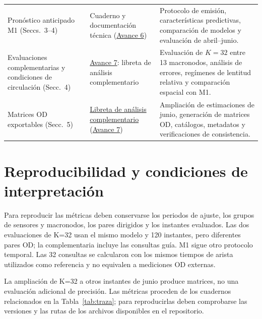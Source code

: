 \documentclass[letterpaper,11pt]{article}
\begin{document}
\begin{table}[H]
\begin{tabular}{@{}
>{\raggedright\arraybackslash}p{.25\linewidth}
>{\raggedright\arraybackslash}p{.27\linewidth}
>{\raggedright\arraybackslash}p{.40\linewidth}
@{}}
Pronóstico anticipado M1 (Seccs.~3--4) &
Cuaderno y documentación técnica
(\href{https://github.com/Luis-MX/route-intelligence/tree/main/docs/entregas/avance-6-prediccion-jornada-siguiente}{Avance 6}) &
Protocolo de emisión, características predictivas, comparación de modelos y evaluación de abril--junio. \\

Evaluaciones complementarias y condiciones de circulación (Secc.~4) &
\href{https://github.com/Luis-MX/route-intelligence/tree/main/docs/entregas/avance-7-proyecto-de-difusion}{Avance 7}: libreta de análisis complementario &
Evaluación de $K=32$ entre 13 macronodos, análisis de errores, regímenes de lentitud relativa y comparación espacial con M1. \\

Matrices OD exportables (Secc.~5) &
\href{https://github.com/Luis-MX/route-intelligence/blob/main/docs/entregas/avance-7-proyecto-de-difusion/Analisis_complementario_M1_K32_y_matrices_OD_Equipo42.ipynb}{Libreta de análisis complementario}
(\href{https://github.com/Luis-MX/route-intelligence/tree/main/docs/entregas/avance-7-proyecto-de-difusion}{Avance 7}) &
Ampliación de estimaciones de junio, generación de matrices OD, catálogos, metadatos y verificaciones de consistencia. \\

\bottomrule
\end{tabular}
\end{table}


\section{Reproducibilidad y condiciones de interpretación}\label{app:cond}
Para reproducir las métricas deben conservarse los periodos de ajuste, los grupos de sensores y macronodos, los pares dirigidos y los instantes evaluados. Las dos evaluaciones de K=32 usan el mismo modelo y 120 instantes, pero diferentes pares OD; la complementaria incluye las consultas guía. M1 sigue otro protocolo temporal. Las 32 consultas se calcularon con los mismos tiempos de arista utilizados como referencia y no equivalen a mediciones OD externas.

La ampliación de K=32 a otros instantes de junio produce matrices, no una evaluación adicional de precisión. Las métricas proceden de los cuadernos relacionados en la Tabla~\ref{tab:traza}; para reproducirlas deben comprobarse las versiones y las rutas de los archivos disponibles en el repositorio.
\end{document}
